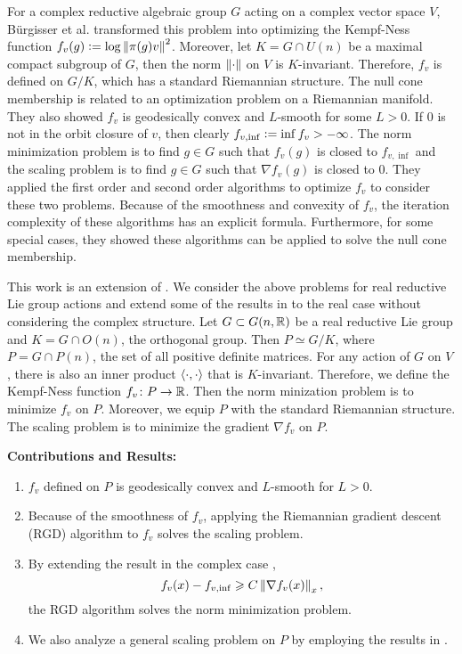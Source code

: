 \documentclass[papersize]{suribtabst}
\begin{document}
	For a complex reductive algebraic group $G$ acting on a complex vector space $V$, B{\"u}rgisser et al. \cite{key8} transformed this problem into optimizing the Kempf-Ness function $f_v(g) \vcentcolon= \log{\left\lVert\pi(g)v\right\lVert^2}$. Moreover, let $K = G \cap U(n)$ be a maximal compact subgroup of $G$, then the norm $\left\lVert\cdot\right\lVert$ on $V$ is $K$-invariant. Therefore, $f_v$ is defined on $G/K$, which has a standard Riemannian structure. The null cone membership is related to an optimization problem on a Riemannian manifold. They also showed $f_v$ is geodesically convex and $L$-smooth for some $L>0$. If $0$ is not in the orbit closure of $v$, then clearly $f_{v,\inf}\vcentcolon=\inf f_v > -\infty$. The norm minimization problem is to find $g \in G$ such that $f_v(g)$ is closed to $f_{v,\inf}$ and the scaling problem is to find $g \in G$ such that $\nabla f_v(g)$ is closed to $0$. They applied the first order and second order algorithms to optimize $f_v$ to consider these two problems. Because of the smoothness and convexity of $f_v$, the iteration complexity of these algorithms has an explicit formula. Furthermore, for some special cases, they showed these algorithms can be applied to solve the null cone membership.

	This work is an extension of \cite{key8}. We consider the above problems for real reductive Lie group actions and extend some of the results in \cite{key8} to the real case without considering the complex structure. Let $G \subset G(n,\mathbb{R})$ be a real reductive Lie group and $K = G \cap O(n)$, the orthogonal group. Then $P \simeq G/K$, where $P = G \cap P(n)$, the set of all positive definite matrices. For any action of $G$ on $V$, there is also an inner product $\langle \cdot,\cdot \rangle$ that is $K$-invariant. Therefore, we define the Kempf-Ness function $f_v \colon P \rightarrow \mathbb{R}$. Then the norm minization problem is to minimize $f_v$ on $P$. Moreover, we equip $P$ with the standard Riemannian structure. The scaling problem is to minimize the gradient $\nabla f_v$ on $P$.

	\textbf{Contributions and Results:} 
	\begin{enumerate}[label=(\arabic*)]
		\item $f_v$ defined on $P$ is geodesically convex and $L$-smooth for $L>0$.
		\item Because of the smoothness of $f_v$, applying the Riemannian gradient descent (RGD) algorithm to $f_v$ solves the scaling problem.
		\item By extending the result in the complex case \cite{key8},
		\begin{equation*}
			f_v(x)- f_{v,\inf} \geqslant C\left\lVert\nabla f_v(x)\right\lVert_x,
		\end{equation*}
		the RGD algorithm solves the norm minimization problem.
		\item We also analyze a general scaling problem on $P$ by employing the results in \cite{key12}.
	\end{enumerate}
\end{document}
